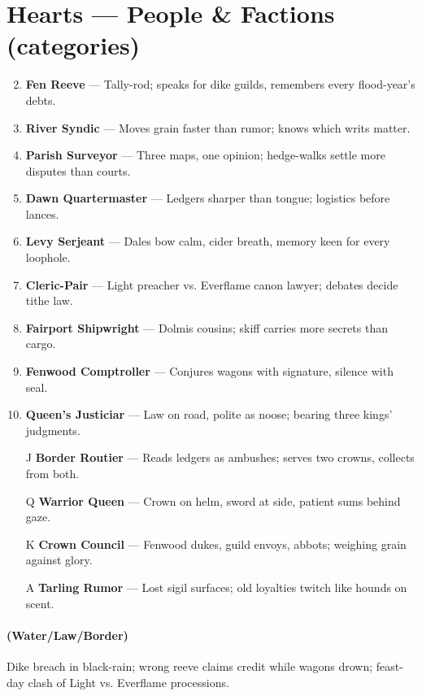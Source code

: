 \section*{Hearts --- People \& Factions (categories)}
\label{sec:viterra-people}
\begin{enumerate}
\setcounter{enumi}{1}
\item \textbf{Fen Reeve} --- Tally-rod; speaks for dike guilds, remembers every flood-year's debts.
\item \textbf{River Syndic} --- Moves grain faster than rumor; knows which writs matter.
\item \textbf{Parish Surveyor} --- Three maps, one opinion; hedge-walks settle more disputes than courts.
\item \textbf{Dawn Quartermaster} --- Ledgers sharper than tongue; logistics before lances.
\item \textbf{Levy Serjeant} --- Dales bow calm, cider breath, memory keen for every loophole.
\item \textbf{Cleric-Pair} --- Light preacher vs. Everflame canon lawyer; debates decide tithe law.
\item \textbf{Fairport Shipwright} --- Dolmis cousins; skiff carries more secrets than cargo.
\item \textbf{Fenwood Comptroller} --- Conjures wagons with signature, silence with seal.
\item \textbf{Queen's Justiciar} --- Law on road, polite as noose; bearing three kings' judgments.
\item[J] \textbf{Border Routier} --- Reads ledgers as ambushes; serves two crowns, collects from both.
\item[Q] \textbf{Warrior Queen} --- Crown on helm, sword at side, patient sums behind gaze.
\item[K] \textbf{Crown Council} --- Fenwood dukes, guild envoys, abbots; weighing grain against glory.
\item[A] \textbf{Tarling Rumor} --- Lost sigil surfaces; old loyalties twitch like hounds on scent.
\end{enumerate}

\paragraph*{(Water/Law/Border)} Dike breach in black-rain; wrong reeve claims credit while wagons drown; feast-day clash of Light vs. Everflame processions.


